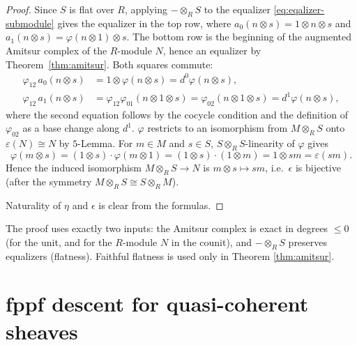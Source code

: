 \begin{proof}
	Since $S$ is flat over $R$, applying $-\otimes_RS$ to the equalizer \ref{eq:eqalizer-submodule} gives the equalizer in the top row, where $a_0(n\otimes s)=1\otimes n\otimes s$ and $a_1(n\otimes s)=\varphi(n\otimes1)\otimes s$. The bottom row is the beginning of the augmented Amitsur complex of the $R$-module $N$, hence an equalizer by Theorem~\ref{thm:amitsur}. Both squares commute:
	\[
	\begin{aligned}
		\varphi_{12}\,a_0(n\otimes s)&=1\otimes\varphi(n\otimes s)=d^0\varphi(n\otimes s),\\
		\varphi_{12}\,a_1(n\otimes s)&=\varphi_{12}\varphi_{01}(n\otimes1\otimes s)=\varphi_{02}(n\otimes1\otimes s)=d^1\varphi(n\otimes s),
	\end{aligned}
	\]
	where the second equation follows by the cocycle condition and the definition of $\varphi_{02}$ as a base change along $d^1$.
	$\varphi$ restricts to an isomorphism from $M\otimes_RS$ onto $\varepsilon(N)\cong N$ by $5$-Lemma. For $m\in M$ and $s\in S$, $S\otimes_RS$-linearity of $\varphi$ gives
	\[
	\varphi(m\otimes s)=(1\otimes s)\cdot\varphi(m\otimes1)=(1\otimes s)\cdot(1\otimes m)=1\otimes sm=\varepsilon(sm).
	\]
	Hence the induced isomorphism $M\otimes_RS\to N$ is $m\otimes s\mapsto sm$, i.e.\ $\epsilon$ is bijective (after the symmetry $M\otimes_RS\cong S\otimes_RM$).
	
	Naturality of $\eta$ and $\epsilon$ is clear from the formulas.
\end{proof}

\begin{remark}
	The proof uses exactly two inputs: the Amitsur complex is exact in degrees $\le0$ (for the unit, and for the $R$-module $N$ in the counit), and $-\otimes_RS$ preserves equalizers (flatness). Faithful flatness is used only in Theorem \ref{thm:amitsur}.
\end{remark}


\section{fppf descent for quasi-coherent sheaves}

